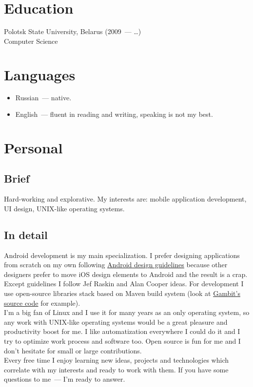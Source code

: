   \section*{Education}

    Polotsk State University, Belarus (2009~--- \dots)\\
    Computer Science

  \section*{Languages}

    \begin{itemize}

      \item Russian~--- native.

      \item English~--- fluent in reading and writing, speaking is not my best.

    \end{itemize}

  \section*{Personal}

    \subsection*{Brief}

      Hard-working and explorative. My interests are:
      mobile application development, UI design, UNIX-like
      operating systems.

    \subsection*{In detail}

      Android development is my main specialization. I prefer designing
      applications from scratch on my own following
      \href{https://developer.android.com/design/}{Android design guidelines}
      because other designers prefer to move iOS design elements to Android
      and the result is a crap. Except guidelines I follow Jef Raskin
      and Alan Cooper ideas. For development I use open-source libraries
      stack based on Maven build system (look at
      \href{https://github.com/ming13/gambit}{Gambit’s source code} for example). \\

      I’m a big fan of Linux and I use it for many years as
      an only operating system, so any work with UNIX-like operating systems
      would be a great pleasure and productivity boost for me.
      I like automatization everywhere I could do it and I try to optimize
      work process and software too. Open source is fun for me and
      I don’t hesitate for small or large contributions. \\

      Every free time I enjoy learning new ideas, projects and technologies
      which correlate with my interests and ready to work with them.
      If you have some questions to me~--- I’m ready to answer.

  \vfill


